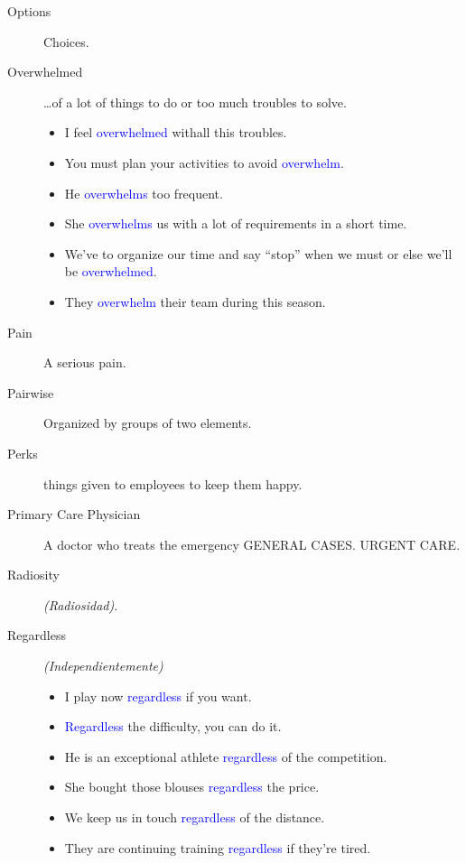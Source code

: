 \begin{multicols}{2}
\begin{description}
\item[Options] Choices.

\item[Overwhelmed] \dots of a lot of things to do or too much troubles to solve.
\begin{itemize}
\item I feel \textcolor{blue}{overwhelmed} withall this troubles.
\item You must plan your activities to avoid \textcolor{blue}{overwhelm}.
\item He \textcolor{blue}{overwhelms} too frequent.
\item She \textcolor{blue}{overwhelms} us with a lot of requirements in a short time.
\item We've to organize our time and say ``stop'' when we must or else we'll be \textcolor{blue}{overwhelmed}.
\item They \textcolor{blue}{overwhelm} their team during this season.
\end{itemize}

\item[Pain] A serious pain.

\item[Pairwise] Organized by groups of two elements.

\item[Perks] things given to employees to keep them happy.

\item[Primary Care Physician] A doctor who treats the emergency GENERAL CASES. URGENT CARE.

\item[Radiosity] \emph{(Radiosidad)}.

\item[Regardless] \emph{(Independientemente)}
\begin{itemize}
\item I play now \textcolor{blue}{regardless} if you want.
\item \textcolor{blue}{Regardless} the difficulty, you can do it.
\item He is an exceptional athlete \textcolor{blue}{regardless} of the competition.
\item She bought those blouses \textcolor{blue}{regardless} the price.
\item We keep us in touch \textcolor{blue}{regardless} of the distance.
\item They are continuing training \textcolor{blue}{regardless} if they're tired.
\end{itemize}


\end{description}
\end{multicols}

